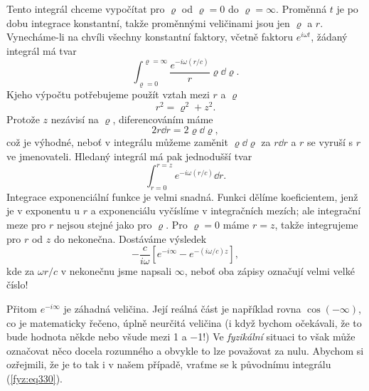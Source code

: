     Tento integrál chceme vypočítat pro \(\varrho\) od \(\varrho = 0\) do \(\varrho = \infty\). 
    Proměnná \(t\) je po dobu integrace konstantní, takže proměnnými veličinami jsou jen 
    \(\varrho\) a \(r\). Vynecháme-li na chvíli všechny konstantní faktory, včetně faktoru 
    \(e^{i\omega t}\), žádaný integrál má tvar
    \begin{equation}\label{fyz:eq328}
      \int_{\varrho=0}^{\varrho=\infty}\frac{e^{-i\omega(r/c)}}{r}\varrho\dd{\varrho}.
    \end{equation}
    Kjeho výpočtu potřebujeme použít vztah mezi \(r\) a \(\varrho\) 
    \begin{equation}\label{fyz:eq329}
      r^2 = \varrho^2 + z^2.
    \end{equation}
    Protože \(z\) nezávisí na \(\varrho\), diferencováním máme 
    \begin{equation*}
      2r\dd{r} = 2\varrho\dd{\varrho},
    \end{equation*}
    což je výhodné, neboť v integrálu můžeme zaměnit \(\varrho\dd{\varrho}\) za \(r\dd{r}\) a \(r\) 
    se vyruší s \(r\) ve jmenovateli. Hledaný integrál má pak jednodušší tvar
    \begin{equation}\label{fyz:eq330}
      \int_{r=0}^{r=z}e^{-i\omega(r/c)}\dd{r}.
    \end{equation}
    Integrace exponenciální funkce je velmi snadná. Funkci dělíme koeficientem, jenž je v exponentu 
    u \(r\) a exponenciálu vyčíslíme v integračních mezích; ale integrační meze pro \(r\) nejsou 
    stejné jako pro \(\varrho\). Pro \(\varrho = 0\) máme \(r = z\), takže integrujeme pro \(r\) od 
    \(z\) do nekonečna. Dostáváme výsledek
    \begin{equation}\label{fyz:eq331}
      -\frac{c}{i\omega}\left[e^{-i\infty} - e^{-(i\omega/c)z}\right],
    \end{equation}
    kde za \(\omega r/c\) v nekonečnu jsme napsali \(\infty\), neboť oba zápisy označují velmi 
    velké číslo!
    
    Přitom \(e^{-i\infty}\) je záhadná veličina. Její reálná část je například rovna 
    \(\cos(-\infty)\), co je matematicky řečeno, úplně neurčitá veličina (i když bychom očekávali, 
    že to bude hodnota někde nebo všude mezi \num{+1} a \num{-1}!) Ve \emph{fyzikální} situaci to 
    však může označovat něco docela rozumného a obvykle to lze považovat za nulu. Abychom si 
    ozřejmili, že je to tak i v našem případě, vraťme se k původnímu integrálu (\ref{fyz:eq330}).
    
